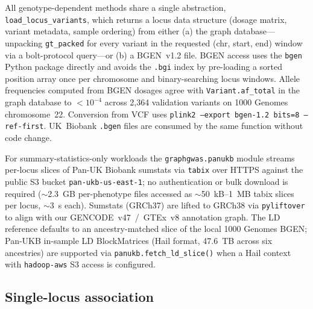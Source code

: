 All genotype-dependent methods share a single abstraction,
\texttt{load\_locus\_variants}, which returns a locus data structure
(dosage matrix, variant metadata, sample ordering) from either
(a) the graph database---unpacking \texttt{gt\_packed} for every
variant in the requested (chr, start, end) window via a
bolt-protocol query---or (b) a BGEN~v1.2 file. BGEN access uses
the \texttt{bgen} Python package directly and avoids the \texttt{.bgi}
index by pre-loading a sorted position array once per chromosome
and binary-searching locus windows. Allele frequencies computed
from BGEN dosages agree with \texttt{Variant.af\_total} in the graph
database to
$<10^{-4}$ across 2{,}364 validation variants on 1000 Genomes
chromosome~22. Conversion from VCF uses
\texttt{plink2 --export bgen-1.2 bits=8 --ref-first}. UK~Biobank
\texttt{.bgen} files are consumed by the same function without code
change.

For summary-statistics-only workloads the \texttt{graphgwas.panukb}
module streams per-locus slices of Pan-UK Biobank sumstats via
\texttt{tabix}\cite{li2011tabix} over HTTPS against the public S3 bucket
\texttt{pan-ukb-us-east-1}; no authentication or bulk download is
required ($\sim$2.3~GB per-phenotype files accessed as
$\sim$50~kB--1~MB tabix slices per locus, $\sim$3~s each). Sumstats
(GRCh37) are lifted to GRCh38 via \texttt{pyliftover} to align with
our GENCODE~v47~/~GTEx~v8 annotation graph. The LD reference
defaults to an ancestry-matched slice of the local 1000 Genomes
BGEN; Pan-UKB in-sample LD BlockMatrices (Hail\cite{hailteam2024} format, 47.6~TB
across six ancestries) are supported via
\texttt{panukb.fetch\_ld\_slice()} when a Hail context with
\texttt{hadoop-aws} S3 access is configured.

\subsection*{Single-locus association}


